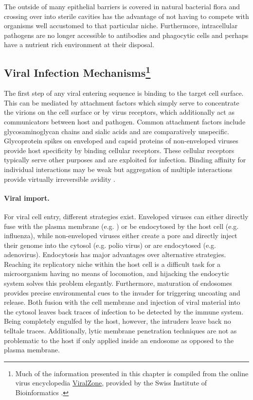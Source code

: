 The outside of many epithelial barriers is covered in natural bacterial flora and crossing over into sterile cavities has the advantage of not having to compete with organisms well accustomed to that particular niche. Furthermore, intracellular pathogens are no longer accessible to antibodies and phagocytic cells and perhaps have a nutrient rich environment at their disposal.

\subsection{Viral Infection Mechanisms\footnote{Much of the information presented in this chapter is compiled from the online virus encyclopedia \href{http://viralzone.expasy.org}{ViralZone}, provided by the Swiss Institute of Bioinformatics \citep{Hulo2011}.}}

The first step of any viral entering sequence is binding to the target cell surface. This can be mediated by attachment factors which simply serve to concentrate the virions on the cell surface or by virus receptors, which additionally act as communicators between host and pathogen. Common attachment factors include glycosaminoglycan chains and sialic acids and are comparatively unspecific. Glycoprotein spikes on enveloped and capsid proteins of non-enveloped viruses provide host specificity by binding cellular receptors. These cellular receptors typically serve other purposes and are exploited for infection. Binding affinity for individual interactions may be weak but aggregation of multiple interactions provide virtually irreversible avidity \citep{Smith2012}.

\paragraph{Viral import.}
For viral cell entry, different strategies exist. Enveloped viruses can either directly fuse with the plasma membrane (e.g. ) or be endocytosed by the host cell (e.g. influenza), while non-enveloped viruses either create a pore and directly inject their genome into the cytosol (e.g. polio virus) or are endocytosed (e.g. adenovirus). Endocytosis has major advantages over alternative strategies. Reaching its replicatory niche within the host cell is a difficult task for a microorganism having no means of locomotion, and hijacking the endocytic system solves this problem elegantly. Furthermore, maturation of endosomes provides precise environmental cues to the invader for triggering uncoating and release. Both fusion with the cell membrane and injection of viral material into the cytosol leaves back traces of infection to be detected by the immune system. Being completely engulfed by the host, however, the intruders leave back no telltale traces. Additionally, lytic membrane penetration techniques are not as problematic to the host if only applied inside an endosome as opposed to the plasma membrane.


